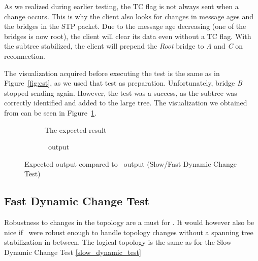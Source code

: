 As we realized during earlier testing, the TC flag is not always sent when a change occurs.
This is why the client also looks for changes in message ages and the bridges in the STP packet.
Due to the message age decreasing (one of the bridges is now root), the client will clear its data even without a TC flag.
With the subtree stabilized, the client will prepend the \textit{Root} bridge to \textit{A} and \textit{C} on reconnection. 

The visualization acquired before executing the test is the same as in Figure~\ref{fig:est}, as we used that test as preparation.
Unfortunately, bridge \textit{B} stopped sending again.
However, the test was a success, as the subtree was correctly identified and added to the large tree.
The visualization we obtained from \tool can be seen in Figure~\ref{fig:dynAfter}.
\begin{figure}[h]
    \begin{subfigure}[b]{\textwidth}
        \centering
        \caption{The expected result}
    \end{subfigure}
       
    \vspace{0.5cm}

    \begin{subfigure}[b]{\textwidth}
        \centering
        
        \caption{\tool\ output}
    \end{subfigure}
    \caption{Expected output compared to \tool\ output (Slow/Fast Dynamic Change Test)}
    \label{fig:dynAfter}
\end{figure}

\subsection*{Fast Dynamic Change Test}
\label{fast_dynamic_test}
Robustness to changes in the topology are a must for \tool.
It would however also be nice if \tool\ were robust enough to handle topology changes without a spanning tree stabilization in between.
The logical topology is the same as for the Slow Dynamic Change Test \ref{slow_dynamic_test}

